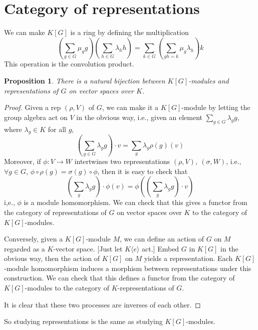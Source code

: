 \documentclass{article}
\theoremstyle{definition}
\theoremstyle{remark}
\theoremstyle{plain}
\newtheorem{prop}[defn]{Proposition}
\begin{document}
\section{Category of representations}
We can make $K[G]$ is a ring by defining the multiplication
\[\left(\sum_{g\in G}\mu_gg\right)\left(\sum_{h\in G}\lambda_hh\right)=\sum_{k\in G}\left(\sum_{gh=k}\mu_g\lambda_h\right)k\]
This operation is the convolution product.
\begin{prop}
    There is a natural bijection between $K[G]$-modules and representations of $G$ on vector spaces over $K$.
\end{prop}
\begin{proof}
    Given a rep $(\rho,V)$ of $G$, we can make it a $K[G]$-module by letting the group algebra act on $V$ in the obvious way, i.e., given an element $\sum_{g\in G}\lambda_gg$, where $\lambda_g\in K$ for all $g$,
    \[\left(\sum_{g\in G}\lambda_gg\right)\cdot v=\sum_g\lambda_g\rho(g)(v)\]
    Moreover, if $\phi:V\to W$ intertwines two representations $(\rho, V),\ (\sigma,W)$, i.e., $\forall g\in G$, $\phi\circ\rho(g)=\sigma(g)\circ\phi$, then it is easy to check that
    \[\left(\sum_g\lambda_gg\right)\cdot \phi(v)=\phi\left(\left(\sum_g\lambda_gg\right)\cdot v\right)\]
    i,e., $\phi$ is a module homomorphism. We can check that this gives a functor from the category of representations of $G$ on vector spaces over $K$ to the category of $K[G]$-modules.
    
    Conversely, given a $K[G]$-module $M$, we can define an action of $G$ on $M$ regarded as a $K$-vector space. [Just let $K\langle e\rangle$ act.] Embed $G$ in $K[G]$ in the obvious way, then the action of $K[G]$ on $M$ yields a representation. Each $K[G]$-module homomorphism induces a morphism between representations under this construction. We can check that this defines a functor from the category of $K[G]$-modules to the category of $K$-representations of $G$.

    It is clear that these two processes are inverses of each other.
\end{proof}
So studying representations is the same as studying $K[G]$-modules.
\end{document}
